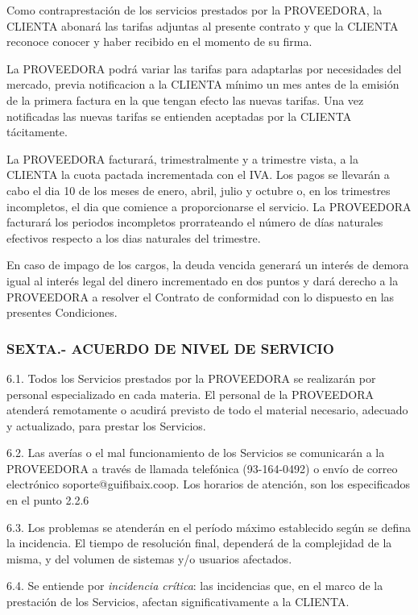 \documentclass[11pt,spanish,a4paper,]{article}
\begin{document}
Como contraprestación de los servicios prestados por la PROVEEDORA, la
CLIENTA abonará las tarifas adjuntas al presente contrato y que la
CLIENTA reconoce conocer y haber recibido en el momento de su firma.

La PROVEEDORA podrá variar las tarifas para adaptarlas por necesidades
del mercado, previa notificacion a la CLIENTA mínimo un mes antes de la
emisión de la primera factura en la que tengan efecto las nuevas
tarifas. Una vez notificadas las nuevas tarifas se entienden aceptadas
por la CLIENTA tácitamente.

La PROVEEDORA facturará, trimestralmente y a trimestre vista, a la
CLIENTA la cuota pactada incrementada con el IVA. Los pagos se llevarán
a cabo el dia 10 de los meses de enero, abril, julio y octubre o, en los
trimestres incompletos, el dia que comience a proporcionarse el
servicio. La PROVEEDORA facturará los periodos incompletos prorrateando
el número de días naturales efectivos respecto a los dias naturales del
trimestre.

En caso de impago de los cargos, la deuda vencida generará un interés de
demora igual al interés legal del dinero incrementado en dos puntos y
dará derecho a la PROVEEDORA a resolver el Contrato de conformidad con
lo dispuesto en las presentes Condiciones.

\subsubsection{SEXTA.- ACUERDO DE NIVEL DE
SERVICIO}\label{sexta.--acuerdo-de-nivel-de-servicio}

6.1. Todos los Servicios prestados por la PROVEEDORA se realizarán por
personal especializado en cada materia. El personal de la PROVEEDORA
atenderá remotamente o acudirá previsto de todo el material necesario,
adecuado y actualizado, para prestar los Servicios.

6.2. Las averías o el mal funcionamiento de los Servicios se comunicarán
a la PROVEEDORA a través de llamada telefónica (93-164-0492) o envío de
correo electrónico soporte@guifibaix.coop. Los horarios de atención, son
los especificados en el punto 2.2.6

6.3. Los problemas se atenderán en el período máximo establecido según
se defina la incidencia. El tiempo de resolución final, dependerá de la
complejidad de la misma, y del volumen de sistemas y/o usuarios
afectados.

6.4. Se entiende por \emph{incidencia crítica}: las incidencias que, en
el marco de la prestación de los Servicios, afectan significativamente a
la CLIENTA.
\end{document}
